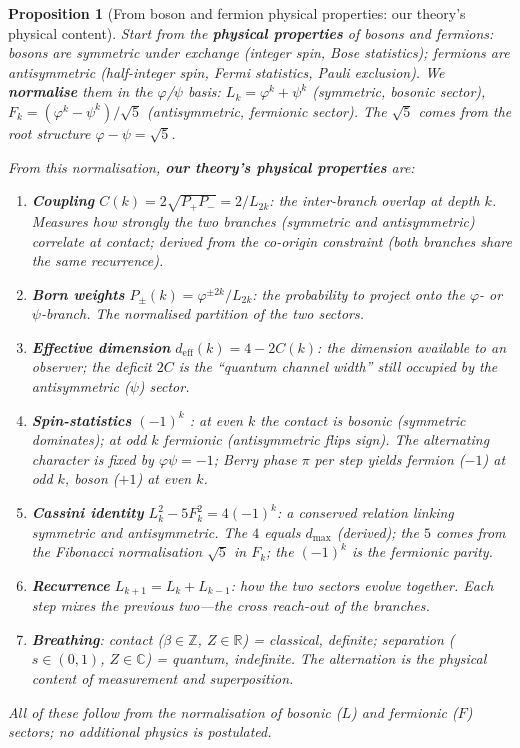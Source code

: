 \documentclass[12pt,a4paper]{article}
\newtheorem{proposition}[theorem]{Proposition}
\begin{document}
\begin{proposition}[From boson and fermion physical properties: our theory's physical content]
\label{prop:physical-from-bf}
Start from the \textbf{physical properties} of bosons and fermions: bosons are symmetric under exchange (integer spin, Bose statistics); fermions are antisymmetric (half-integer spin, Fermi statistics, Pauli exclusion). We \textbf{normalise} them in the $\varphi$/$\psi$ basis: $L_k = \varphi^k + \psi^k$ (symmetric, bosonic sector), $F_k = (\varphi^k - \psi^k)/\sqrt{5}$ (antisymmetric, fermionic sector). The $\sqrt{5}$ comes from the root structure $\varphi - \psi = \sqrt{5}$.

\medskip
\noindent From this normalisation, \textbf{our theory's physical properties} are:

\begin{enumerate}[nosep]
\item \textbf{Coupling} $C(k) = 2\sqrt{P_+P_-} = 2/L_{2k}$: the inter-branch overlap at depth $k$. Measures how strongly the two branches (symmetric and antisymmetric) correlate at contact; derived from the co-origin constraint (both branches share the same recurrence).
\item \textbf{Born weights} $P_\pm(k) = \varphi^{\pm 2k}/L_{2k}$: the probability to project onto the $\varphi$- or $\psi$-branch. The normalised partition of the two sectors.
\item \textbf{Effective dimension} $d_{\mathrm{eff}}(k) = 4 - 2C(k)$: the dimension available to an observer; the deficit $2C$ is the ``quantum channel width'' still occupied by the antisymmetric ($\psi$) sector.
\item \textbf{Spin-statistics} $(-1)^k$ \label{cor:spin-statistics}: at even $k$ the contact is bosonic (symmetric dominates); at odd $k$ fermionic (antisymmetric flips sign). The alternating character is fixed by $\varphi\psi = -1$; Berry phase $\pi$ per step yields fermion ($-1$) at odd $k$, boson ($+1$) at even $k$.
\item \textbf{Cassini identity} $L_k^2 - 5F_k^2 = 4(-1)^k$: a conserved relation linking symmetric and antisymmetric. The $4$ equals $d_{\max}$ (derived); the $5$ comes from the Fibonacci normalisation $\sqrt{5}$ in $F_k$; the $(-1)^k$ is the fermionic parity.
\item \textbf{Recurrence} $L_{k+1} = L_k + L_{k-1}$: how the two sectors evolve together. Each step mixes the previous two---the cross reach-out of the branches.
\item \textbf{Breathing}: contact ($\beta \in \mathbb{Z}$, $Z \in \mathbb{R}$) = classical, definite; separation ($s \in (0,1)$, $Z \in \mathbb{C}$) = quantum, indefinite. The alternation is the physical content of measurement and superposition.
\end{enumerate}

\noindent All of these follow from the normalisation of bosonic ($L$) and fermionic ($F$) sectors; no additional physics is postulated.
\end{proposition}
\end{document}
